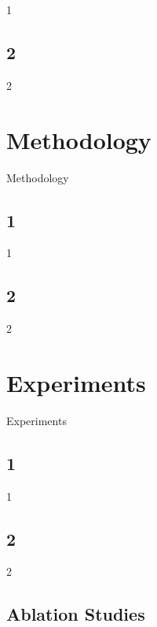 \documentclass[runningheads]{llncs}
\begin{document}
1

\subsection{2}

2




\section{Methodology}

Methodology

\subsection{1}

1

\subsection{2}

2









\section{Experiments}

Experiments
\subsection{1}

1








\subsection{2}

2








\subsection{Ablation Studies}

\end{document}
